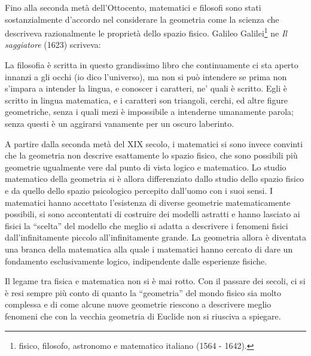 Fino alla seconda metà dell'Ottocento, matematici e filosofi sono 
stati sostanzialmente d'accordo nel considerare la geometria come la 
scienza che descriveva razionalmente le proprietà dello spazio 
fisico. Galileo Galilei\footnote{fisico, filosofo, astronomo e 
matematico italiano (1564 - 1642).} ne \emph{Il saggiatore} (1623) 
scriveva:
\begin{quoting}
La filosofia è scritta in questo grandissimo libro che continuamente 
ci sta aperto innanzi a gli occhi (io dico l'universo), ma non si può 
intendere se prima non s'impara a intender la lingua, e conoscer i 
caratteri, ne' quali è scritto. Egli è scritto in lingua matematica, 
e i caratteri son triangoli, cerchi, ed altre figure geometriche, 
senza i quali mezi è impossibile a intenderne umanamente parola; 
senza questi è un aggirarsi vanamente per un oscuro laberinto.
\end{quoting}
A partire dalla seconda metà del XIX secolo, i matematici si sono 
invece convinti che la geometria non descrive esattamente lo spazio 
fisico, che sono possibili più geometrie ugualmente vere dal punto di 
vista logico e matematico. Lo studio matematico della geometria si è 
allora differenziato dallo studio dello spazio fisico e da quello 
dello spazio psicologico percepito dall'uomo con i suoi sensi. I 
matematici hanno accettato l'esistenza di diverse geometrie 
matematicamente possibili, si sono accontentati di costruire dei 
modelli astratti e hanno lasciato ai fisici la ``scelta'' del modello 
che meglio si adatta a descrivere i fenomeni fisici 
dall'infinitamente piccolo all'infinitamente grande. La geometria 
allora è diventata una branca della matematica alla quale i matematici 
hanno cercato di dare un fondamento esclusivamente logico, 
indipendente dalle esperienze fisiche. 

Il legame tra fisica e matematica non si è mai rotto. Con il passare 
dei secoli, ci si è resi sempre più conto di quanto la ``geometria'' 
del mondo fisico sia molto complessa e di come alcune nuove geometrie 
riescono a descrivere meglio fenomeni che con la vecchia geometria di 
Euclide non si riusciva a spiegare.

